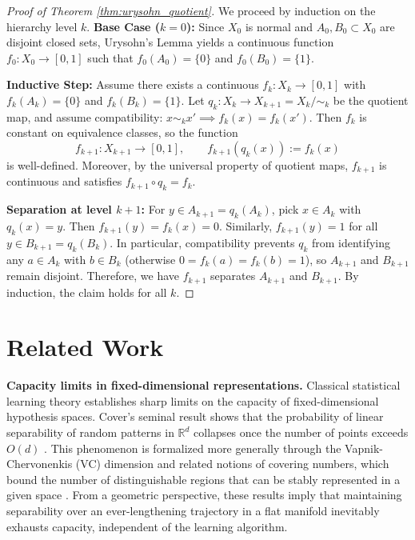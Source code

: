\documentclass{article}
\begin{document}
\begin{proof}[Proof of Theorem \ref{thm:urysohn_quotient}]
We proceed by induction on the hierarchy level $k$.
\textbf{Base Case ($k=0$):}
Since $X_0$ is normal and $A_0,B_0\subset X_0$ are disjoint closed sets, Urysohn's Lemma yields a continuous function
$f_0:X_0\to[0,1]$ such that $f_0(A_0)=\{0\}$ and $f_0(B_0)=\{1\}$.
 
\textbf{Inductive Step:}
Assume there exists a continuous $f_k:X_k\to[0,1]$ with $f_k(A_k)=\{0\}$ and $f_k(B_k)=\{1\}$.
Let $q_k:X_k\to X_{k+1}=X_k/{\sim_k}$ be the quotient map, and assume compatibility:
$x\sim_k x' \implies f_k(x)=f_k(x')$.
Then $f_k$ is constant on equivalence classes, so the function
\[
f_{k+1}:X_{k+1}\to[0,1],\qquad f_{k+1}(q_k(x)):=f_k(x)
\]
is well-defined. Moreover, by the universal property of quotient maps, $f_{k+1}$ is continuous and satisfies
$f_{k+1}\circ q_k=f_k$.
 
\textbf{Separation at level $k+1$:}
For $y\in A_{k+1}=q_k(A_k)$, pick $x\in A_k$ with $q_k(x)=y$. Then
$f_{k+1}(y)=f_k(x)=0$.
Similarly, $f_{k+1}(y)=1$ for all $y\in B_{k+1}=q_k(B_k)$.
In particular, compatibility prevents $q_k$ from identifying any $a\in A_k$ with $b\in B_k$ (otherwise $0=f_k(a)=f_k(b)=1$), so $A_{k+1}$ and $B_{k+1}$ remain disjoint.
Therefore, we have $f_{k+1}$ separates $A_{k+1}$ and $B_{k+1}$. By induction, the claim holds for all $k$.
\end{proof}

\section{Related Work}
\label{sec:related}
 
\noindent\textbf{Capacity limits in fixed-dimensional representations.}
Classical statistical learning theory establishes sharp limits on the capacity of fixed-dimensional hypothesis spaces.
Cover’s seminal result shows that the probability of linear separability of random patterns in $\mathbb{R}^d$ collapses once the number of points exceeds $O(d)$ \cite{cover1965geometry}.
This phenomenon is formalized more generally through the Vapnik-Chervonenkis (VC) dimension and related notions of covering numbers, which bound the number of distinguishable regions that can be stably represented in a given space \cite{vapnik1998statistical,shalev2014understanding}.
From a geometric perspective, these results imply that maintaining separability over an ever-lengthening trajectory in a flat manifold inevitably exhausts capacity, independent of the learning algorithm.
 
\end{document}
